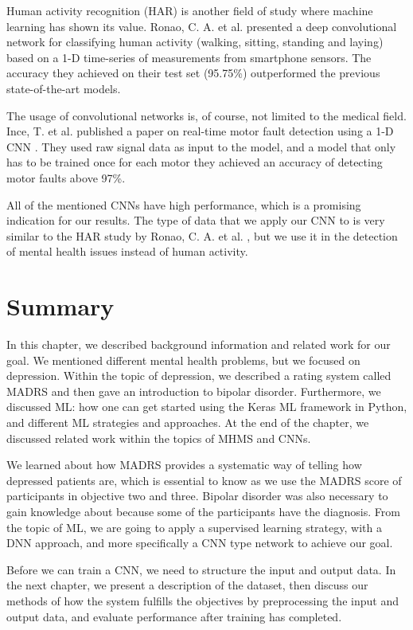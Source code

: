 Human activity recognition (HAR) is another field of study where machine learning has shown its value. Ronao, C. A. et al. presented a deep convolutional network \cite{ronao_har_conv} for classifying human activity (walking, sitting, standing and laying) based on a 1-D time-series of measurements from smartphone sensors. The accuracy they achieved on their test set (95.75\%) outperformed the previous state-of-the-art models. 

The usage of convolutional networks is, of course, not limited to the medical field. Ince, T. et al. published a paper on real-time motor fault detection using a 1-D CNN \cite{motor_fault_conv}. They used raw signal data as input to the model, and a model that only has to be trained once for each motor they achieved an accuracy of detecting motor faults above 97\%.

All of the mentioned CNNs have high performance, which is a promising indication for our results. The type of data that we apply our CNN to is very similar to the HAR study by Ronao, C. A. et al. \cite{ronao_har_conv}, but we use it in the detection of mental health issues instead of human activity. 

\section{Summary}
In this chapter, we described background information and related work for our goal. We mentioned different mental health problems, but we focused on depression. Within the topic of depression, we described a rating system called MADRS and then gave an introduction to bipolar disorder. Furthermore, we discussed ML: how one can get started using the Keras ML framework in Python, and different ML strategies and approaches. At the end of the chapter, we discussed related work within the topics of MHMS and CNNs. 

We learned about how MADRS provides a systematic way of telling how depressed patients are, which is essential to know as we use the MADRS score of participants in objective two and three. Bipolar disorder was also necessary to gain knowledge about because some of the participants have the diagnosis. From the topic of ML, we are going to apply a supervised learning strategy, with a DNN approach, and more specifically a CNN type network to achieve our goal. 

Before we can train a CNN, we need to structure the input and output data. In the next chapter, we present a description of the dataset, then discuss our methods of how the system fulfills the objectives by preprocessing the input and output data, and evaluate performance after training has completed. 